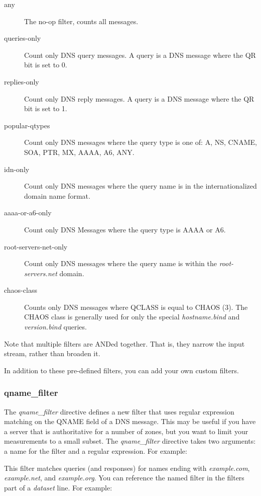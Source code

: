 \documentclass{report}
\begin{document}
\begin{description}
\item[any]
	The no-op filter, counts all messages.
\item[queries-only]
	Count only DNS query messages.  A query is a DNS message
	where the QR bit is set to 0.
\item[replies-only]
	Count only DNS reply messages.  A query is a DNS message 
        where the QR bit is set to 1.
\item[popular-qtypes]
	Count only DNS messages where the query type is one of:
	A, NS, CNAME, SOA, PTR, MX, AAAA, A6, ANY.
\item[idn-only]
	Count only DNS messages where the query name is in the
	internationalized domain name format.
\item[aaaa-or-a6-only]
	Count only DNS Messages where the query type is AAAA or A6.
\item[root-servers-net-only]
	Count only DNS messages where the query name is within
	the {\em root-servers.net\/} domain.
\item[chaos-class]
	Counts only DNS messages where QCLASS is equal to
	CHAOS (3).  The CHAOS class is generally used
	for only the special {\em hostname.bind\/} and
	{\em version.bind\/} queries.
\end{description}

\noindent
Note that multiple filters are ANDed together.  That is, they
narrow the input stream, rather than broaden it.

In addition to these pre-defined filters, you can add your own
custom filters.

\subsubsection{qname\_filter}
\label{sec-qname-filter}

The {\em qname\_filter} directive defines a new
filter that uses regular expression matching on the QNAME field of
a DNS message.  This may be useful if you have a server that is
authoritative for a number of zones, but you want to limit
your measurements to a small subset.  The {\em qname\_filter} directive
takes two arguments: a name for the filter and a regular expression.
For example:


This filter matches queries (and responses) for names ending with
{\em example.com\/}, {\em example.net\/}, and {\em example.org\/}.
You can reference the named filter in the filters part of a {\em
dataset\/} line.  For example:
\end{document}
